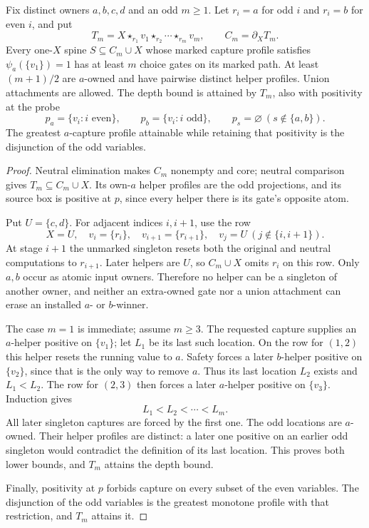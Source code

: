 \begin{proposition}
\label{core:prop:single-capture-depth}
Fix distinct owners $a,b,c,d$ and an odd $m\geq1$. Let $r_i=a$
for odd $i$ and $r_i=b$ for even $i$, and put
\[
 T_m=X\star_{r_1}v_1\star_{r_2}\cdots\star_{r_m}v_m,
 \qquad C_m=\partial_XT_m.
\]
Every one-$X$ spine $S\subseteq C_m\cup X$ whose marked capture
profile satisfies $\psi_a(\{v_1\})=1$ has at least $m$ choice gates
on its marked path. At least $(m+1)/2$ are $a$-owned and have
pairwise distinct helper profiles. Union attachments are allowed.
The depth bound is attained by $T_m$, also with positivity at the probe
\[
 p_a=\{v_i:i\text{ even}\},\qquad
 p_b=\{v_i:i\text{ odd}\},\qquad p_s=\varnothing\ (s\notin\{a,b\}).
\]
The greatest $a$-capture profile attainable while retaining that
positivity is the disjunction of the odd variables.
\end{proposition}
\begin{proof}
Neutral elimination makes $C_m$ nonempty and core; neutral comparison gives
$T_m\subseteq C_m\cup X$. Its own-$a$ helper profiles are the odd
projections, and its source box is positive at $p$, since every helper
there is its gate's opposite atom.

Put $U=\{c,d\}$. For adjacent indices $i,i+1$, use the row
\[
 X=U,\quad v_i=\{r_i\},\quad v_{i+1}=\{r_{i+1}\},
 \quad v_j=U\ (j\notin\{i,i+1\}).
\]
At stage $i+1$ the unmarked singleton resets both the original and
neutral computations to $r_{i+1}$. Later helpers are $U$, so
$C_m\cup X$ omits $r_i$ on this row.
Only $a,b$ occur as atomic input owners. Therefore no helper can be
a singleton of another owner, and neither an extra-owned gate nor a
union attachment can erase an installed $a$- or $b$-winner.

The case $m=1$ is immediate; assume $m\geq3$.
The requested capture supplies an $a$-helper positive on $\{v_1\}$;
let $L_1$ be its last such location. On the row for $(1,2)$ this
helper resets the running value to $a$. Safety forces a later
$b$-helper positive on $\{v_2\}$, since that is the only way to
remove $a$. Thus its last location $L_2$ exists and $L_1<L_2$.
The row for $(2,3)$ then forces a later $a$-helper positive on
$\{v_3\}$. Induction gives
\[
 L_1<L_2<\cdots<L_m.
\]
All later singleton captures are forced by the first one. The odd
locations are $a$-owned. Their helper profiles are distinct: a later
one positive on an earlier odd singleton would contradict the
definition of its last location. This proves both lower bounds,
and $T_m$ attains the depth bound.

Finally, positivity at $p$ forbids capture on every subset of the
even variables. The disjunction of the odd variables is the greatest
monotone profile with that restriction, and $T_m$ attains it.
\end{proof}

